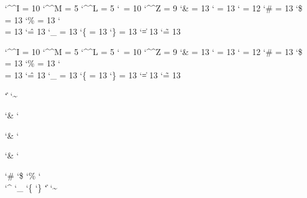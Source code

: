 \startcatcodetable \xmlcatcodese
    \catcode`\^^I = 10 %
    \catcode`\^^M =  5 %
    \catcode`\^^L =  5 %
    \catcode`\    = 10 %
    \catcode`\^^Z =  9 %
    \catcode`\&   = 13 %
    \catcode`\<   = 13 %
    \catcode`\>   = 12
    \catcode`\#   = 13
    \catcode`\$   = 13
    \catcode`\%   = 13
    \catcode`\\   = 13
    \catcode`\^   = 13
    \catcode`\_   = 13
    \catcode`\{   = 13
    \catcode`\}   = 13
    \catcode`\|   = 13
    \catcode`\~   = 13
\stopcatcodetable

\startcatcodetable \xmlcatcodesr
    \catcode`\^^I = 10 %
    \catcode`\^^M =  5 %
    \catcode`\^^L =  5 %
    \catcode`\    = 10 %
    \catcode`\^^Z =  9 %
    \catcode`\&   = 13 %
    \catcode`\<   = 13 %
    \catcode`\>   = 12
    \catcode`\#   = 13
    \catcode`\$   = 13
    \catcode`\%   = 13
    \catcode`\\   = 13
    \catcode`\^   = 13
    \catcode`\_   = 13
    \catcode`\{   = 13
    \catcode`\}   = 13
    \catcode`\|   = 13
    \catcode`\~   = 13
\stopcatcodetable

 \ctxcatcodes  `\|   \relax
{} \ctxcatcodes  `\~   \relax


 \xmlcatcodesn `\&   \relax
{} \xmlcatcodesn `\<   \relax

 \xmlcatcodese `\&   \relax
{} \xmlcatcodese `\<   \relax

 \xmlcatcodesr `\&   \relax
{} \xmlcatcodesr `\<   \relax

 \xmlcatcodese `\#   \relax
{} \xmlcatcodese `\$   \relax
{} \xmlcatcodese `\%   \relax
{} \xmlcatcodese `\\   \relax
{} \xmlcatcodese `\^   \relax
{} \xmlcatcodese `\_   \relax
{} \xmlcatcodese `\{   \relax
{} \xmlcatcodese `\}   \relax
{} \xmlcatcodese `\|   \relax
{} \xmlcatcodese `\~   \relax

